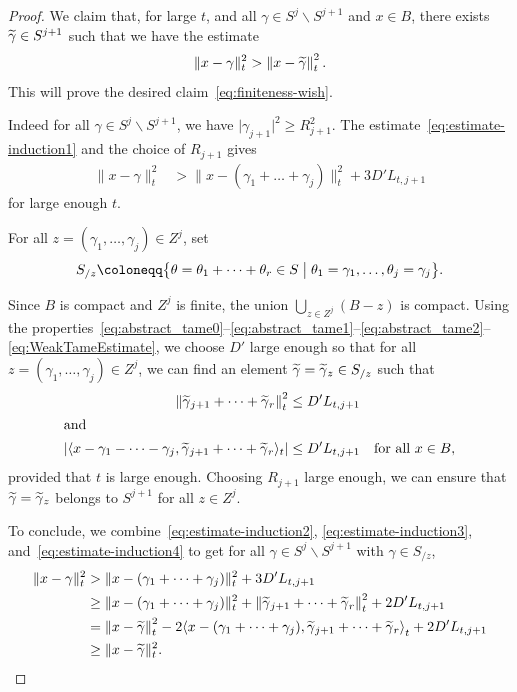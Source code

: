 \documentclass[AHL,Unicode,longabstracts]{cedram}
\newcommand{\innone}[2]{{\langle#2\rangle_{#1}}}
\newcommand{\binnone}[2]{{\left\langle#2\right\rangle_{#1}}}
\newcommand{\normsq}[1]{\|#1\|^{2}}
\newcommand{\normbsq}[1]{\left\|#1\right\|^{2}}
\newcommand{\refnormsq}[1]{\lvert#1\rvert^{2}}
\newcommand{\abss}[1]{\left\lvert #1\right\rvert}
\renewcommand{\setminus}{\smallsetminus}
\let\oldtilde\tilde
\renewcommand*{\tilde}[1]{\mathchoice{\widetilde{#1}}{\widetilde{#1}}{\oldtilde{#1}}{\oldtilde{#1}}}
\begin{document}
\begin{proof}
We claim that, for large $t$, and all $\gamma \in S^j \setminus S^{j+1}$ and $x \in B$, there exists $\tilde \gamma \in S^{j+1}$ such that we have the estimate
\begin{equation}\label{eq:FinitenessFinalStep}
\normsq{x - \gamma}_t > \normbsq{x - \tilde \gamma}_t.
\end{equation}
This will prove the desired claim~\eqref{eq:finiteness-wish}.



Indeed for all $\gamma \in S^j \setminus S^{j+1}$, we have $\refnormsq{\gamma_{j+1}} \ge R_{j+1}^2$. The estimate~\eqref{eq:estimate-induction1} and the choice of $R_{j+1}$ gives
\begin{align}\label{eq:estimate-induction2}
\normsq{x - \gamma}_t & > \normsq{x-(\gamma_1 + \dots +\gamma_j)}_t + 3D' L_{t, j+1}
\end{align}
for large enough $t$.



For all $z = (\gamma_1, \dots, \gamma_j) \in Z^j$, set
\[
S_{/z} \coloneqq \bigl\{ \theta =\theta_1+ \dots+\theta_r \in S\bigm| \theta_1=\gamma_1, \dots, \theta_j = \gamma_j\bigr\}.
\]

Since $B$ is compact and $Z^j$ is finite, the union $\bigcup_{z\in Z^j} \left(B -z\right)$ is compact. Using the properties~\eqref{eq:abstract_tame0}--\eqref{eq:abstract_tame1}--\eqref{eq:abstract_tame2}--\eqref{eq:WeakTameEstimate}, we choose $D'$ large enough so that for all $z =(\gamma_1, \dots, \gamma_j)\in Z^j$, we can find an element $\tilde \gamma = \tilde\gamma_z \in S_{/z}$ such that
\begin{align}
\normbsq{\tilde \gamma_{j+1} + \dots + \tilde \gamma_r}_t &\leq D' L_{t, j+1} \label{eq:estimate-induction3} \\
\intertext{and}
\abss{\innone{t}{x-\gamma_1-\dots-\gamma_j, \tilde \gamma_{j+1} + \dots + \tilde \gamma_r }} &\leq D' L_{t,j+1} \quad \text{for all $x\in B$},\label{eq:estimate-induction4}
\end{align}
provided that $t$ is large enough. Choosing $R_{j+1}$ large enough, we can ensure that $\tilde \gamma = \tilde\gamma_z$ belongs to $S^{j+1}$ for all $z \in Z^j$.

To conclude, we combine~\eqref{eq:estimate-induction2}, \eqref{eq:estimate-induction3}, and~\eqref{eq:estimate-induction4} to get for all $\gamma \in S^j \setminus S^{j+1}$ with $\gamma \in S_{/z}$,
\begin{align*}
\normsq{x - \gamma}_t & > \normsq{x-(\gamma_1 + \dots +\gamma_j)}_t + 3D' L_{t, j+1} \\
&\ge \normsq{x-(\gamma_1 + \dots +\gamma_j)}_t + \normbsq{\tilde \gamma_{j+1} + \dots + \tilde \gamma_r}_t + 2 D' L_{t,j+1} \\
& = \normbsq{x- \tilde \gamma}_t - 2 \binnone{t}{x-(\gamma_1 + \dots +\gamma_j), \tilde \gamma_{j+1} + \dots + \tilde \gamma_r } + 2 D' L_{t,j+1} \\
&\ge \normsq{x- \tilde \gamma}_t.
\end{align*}


\end{proof}
\end{document}
